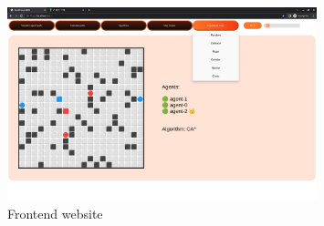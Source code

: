 \begin{figure}[H]
    \centering
    \includegraphics[width=0.8\textwidth]{pictures/frontend.png}
    \caption{ Frontend website } 
    \label{fig:frontend}
\end{figure}